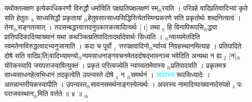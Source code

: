 \documentclass[article,12pt,a4paper]{memoir}%
\newcommand{\quotelemma}[1]{\textcolor{cyan}{#1}}
\newcounter{parCount}
\begin{document}
	  
	  \pstart \leavevmode%
	यथोक्तलक्षण इत्येकाधिकरणौ विरुद्धौ धर्माविति पक्षप्रतिपक्षलक्षणं स्म{\tiny $_{lb}$}रयति । परिग्रहे वादिप्रतिवादिभ्यां कृते सति हेतुतः {\tiny $_{8}$} साध्यसिद्धौ प्रकृतायां {\tiny $_{lb}$}हेतुवसात्साध्यसिद्धिरित्येतस्मिन्प्रकरणे सति प्रकृतोर्थः शब्दनित्यत्वं । तेना{\tiny $_{lb}$}सङ्गतत्वात् । तदसम्बद्धत्त्वात्तदनुपकारकत्वादित्यर्थः [।] तथा {\tiny $_{9}$} \leavevmode{} हि विनापिरूपसि{\tiny $_{lb}$}द्ध्या प्रातिपदिकादिव्याख्यानं यथा कथञ्चित्प्रतिपादितादर्थादेवार्थः सिध्यति । {\tiny $_{lb}$}न्याय्यमेतदिति स्वमतेनाविरुद्धत्वादभ्यनुजानाति । कदा च पूर्वो {\tiny $_{1}$} त्तरपक्षवादिनो{\tiny $_{lb}$}र्न्याय्यं निग्रहस्थानमित्याह । प्रतिपादिते दोषे सति वादिप्र[ति]वादिभ्यामन्यो{\tiny $_{lb}$}न्यमसाधनाङ्गवचनमेतददोषद्भावनञ्च भवेदिति अन्यथा न ह्य {\tiny $_{2}$} [न]{\tiny $_{lb}$}\leavevmode{} योरेकस्यापि जयपराजयावित्युक्तं । प्रकृतं परित्यज्येति न्याय्यतामेवास्य {\tiny $_{lb}$}प्रतिपादयति । प्रकृतमत्र साध्यसाधनहेत्वभिधानं तदकृत्वेति उपन्यस्ते दोषे {\tiny $_{3}$} न {\tiny $_{lb}$}समर्थनं । \quotelemma{अपरस्य} \cite[13a7]{vn-msN} रूपसिध्यादेः । अतन्नान्तरीयकस्यापीति । उपन्यस्त{\tiny $_{lb}$}सावनसमर्थनाङ्गस्येत्यर्थः । अपरस्य नामादिव्याख्यानादेरुपक्षे {\tiny $_{4}$} पः पराजयस्थान{\tiny $_{lb}$}मिति वर्त्तते ॥ ४ ॥
	{}
	\pend%
      {\tiny $_{lb}$}
\end{document}
